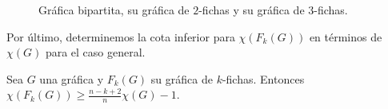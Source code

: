 \begin{figure}[ht!]
\caption{Gr\'afica bipartita, su gr\'afica de $2$-fichas y su gr\'afica de $3$-fichas.}
\label{fig:ex-bip}
\end{figure}

\pagebreak

Por \'ultimo, determinemos la cota inferior para $\chi (F_k(G))$ en t\'erminos de $\chi (G)$
para el caso general.

\begin{teorema}
\label{teo:numCrom-k}
    Sea $G$ una gr\'afica y $F_k(G)$ su gr\'afica de $k$-fichas. Entonces
    $\chi(F_k(G)) \geq \frac{n-k+2}{n} \chi(G) -1$.
\end{teorema}
        
